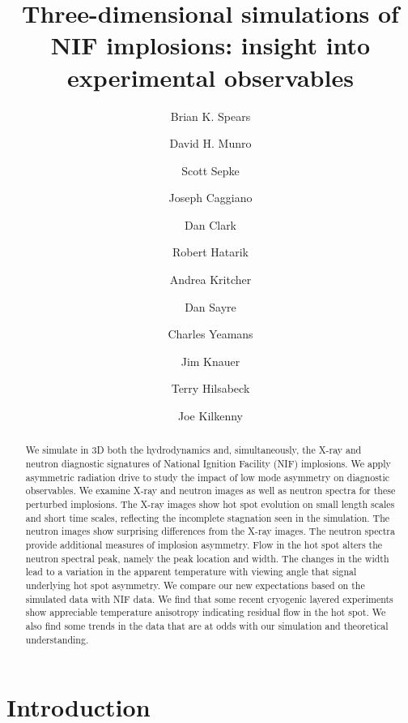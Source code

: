 \documentclass[aip,pop,numerical,reprint,floatfix]{revtex4-1}
\begin{document}
\title{Three-dimensional simulations of NIF implosions: insight into experimental
observables}

\author{Brian K. Spears}
\author{David H. Munro}
\author{Scott Sepke}
\author{Joseph Caggiano}
\author{Dan Clark}
\author{Robert Hatarik}
\author{Andrea Kritcher}
\author{Dan Sayre}
\author{Charles Yeamans}

\author{Jim Knauer}

\author{Terry Hilsabeck}
\author{Joe Kilkenny}

\begin{abstract}
We simulate in 3D both the hydrodynamics and, simultaneously, the
X-ray and neutron diagnostic signatures of National Ignition Facility
(NIF) implosions. We apply asymmetric radiation drive to study the
impact of low mode asymmetry on diagnostic observables. We examine
X-ray and neutron images as well as neutron spectra for these perturbed
implosions. The X-ray images show hot spot evolution on small length
scales and short time scales, reflecting the incomplete stagnation
seen in the simulation. The neutron images show surprising differences
from the X-ray images. The neutron spectra provide additional measures
of implosion asymmetry. Flow in the hot spot alters the neutron spectral
peak, namely the peak location and width. The changes in the width
lead to a variation in the apparent temperature with viewing angle
that signal underlying hot spot asymmetry. We compare our new expectations
based on the simulated data with NIF data. We find that some recent
cryogenic layered experiments show appreciable temperature anisotropy
indicating residual flow in the hot spot. We also find some trends
in the data that are at odds with our simulation and theoretical understanding.
\end{abstract}

\maketitle

\section{\label{sec:Introduction}Introduction}
\end{document}
